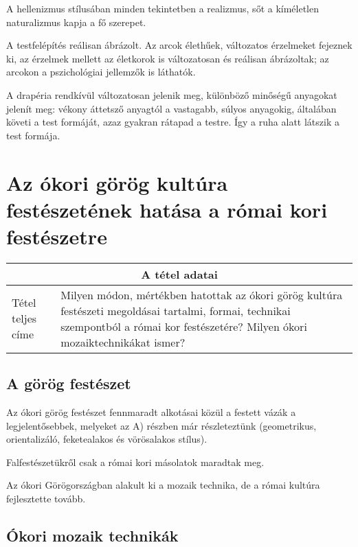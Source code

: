 	A hellenizmus stílusában minden tekintetben a realizmus, sőt a kíméletlen naturalizmus kapja a fő szerepet.	
	
	A testfelépítés reálisan ábrázolt. Az arcok élethűek, változatos érzelmeket fejeznek ki, az érzelmek mellett az életkorok is változatosan és reálisan ábrázoltak; az arcokon a pszichológiai jellemzők is láthatók.
	
	A drapéria rendkívül változatosan jelenik meg, különböző minőségű anyagokat jelenít meg: vékony áttetsző anyagtól a vastagabb, súlyos anyagokig, általában követi a test formáját, azaz gyakran rátapad a testre. Így a ruha alatt látszik a test formája.

\cleardoublepage

\section{Az ókori görög kultúra festészetének hatása a római kori festészetre}

\begin{center}
	\begin{longtable}{ | p{} | p{} | }
		
		\hline
		\multicolumn{2}{|c|}{\textbf{A tétel adatai}}
		\\ \hline
		
		\hline
		Tétel teljes címe &
		Milyen módon, mértékben hatottak az ókori görög kultúra festészeti megoldásai tartalmi, formai, technikai szempontból a római kor festészetére? Milyen ókori mozaiktechnikákat ismer?
		\\ \hline
		
	\end{longtable}
\end{center}

\subsection*{A görög festészet}

Az ókori görög festészet fennmaradt alkotásai közül a festett vázák a legjelentősebbek, melyeket az A) részben már részleteztünk (geometrikus, orientalizáló, feketealakos és vörösalakos stílus).

 Falfestészetükről csak a római kori másolatok maradtak meg.

Az ókori Görögországban alakult ki a mozaik technika, de a római kultúra fejlesztette tovább.

\subsection*{Ókori mozaik technikák}


